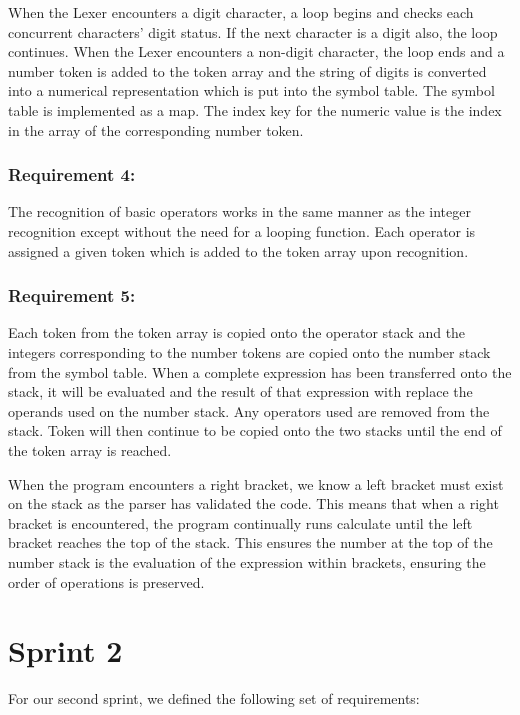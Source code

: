 \documentclass[a4paper, oneside, 11pt]{report}
\begin{document}
When the Lexer encounters a digit character, a loop begins and checks each concurrent characters’ digit status. If the next character is a digit also, the loop continues. When the Lexer encounters a non-digit character, the loop ends and a number token is added to the token array and the string of digits is converted into a numerical representation which is put into the symbol table. The symbol table is implemented as a map. The index key for the numeric value is the index in the array of the corresponding number token. 

\subsubsection{Requirement 4: }

The recognition of basic operators works in the same manner as the integer recognition except without the need for a looping function. Each operator is assigned a given token which is added to the token array upon recognition. 

\subsubsection{Requirement 5: }

Each token from the token array is copied onto the operator stack and the integers corresponding to the number tokens are copied onto the number stack from the symbol table. When a complete expression has been transferred onto the stack, it will be evaluated and the result of that expression with replace the operands used on the number stack. Any operators used are removed from the stack. Token will then continue to be copied onto the two stacks until the end of the token array is reached.  

When the program encounters a right bracket, we know a left bracket must exist on the stack as the parser has validated the code. This means that when a right bracket is encountered, the program continually runs calculate until the left bracket reaches the top of the stack. This ensures the number at the top of the number stack is the evaluation of the expression within brackets, ensuring the order of operations is preserved. 

\section{Sprint 2}

For our second sprint, we defined the following set of requirements: 
\end{document}
